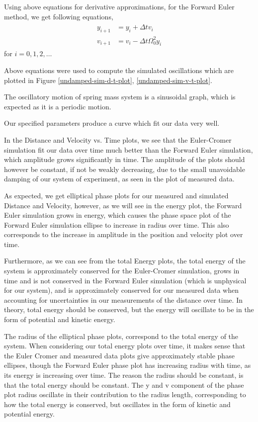 \documentclass[letterpaper,12pt]{article}
\begin{document}
Using above equations for derivative approximations, for the Forward Euler method, we get following equations,
\begin{eqnarray*}
  \begin{split}
    y_{i+1} &= y_i + \Delta t v_i \\
    v_{i+1} &= v_i -\Delta t \Omega_0^2 y_i
  \end{split}
\end{eqnarray*}
for $i = 0, 1, 2, \dots$

Above equations were used to compute the simulated oscillations which are plotted in Figure \ref{undamped-sim-d-t-plot}, \ref{undamped-sim-v-t-plot}. 

The oscillatory motion of spring mass system is a sinusoidal graph, which is expected as it is a periodic motion.

Our specified parameters produce a curve which fit our data very well.

In the Distance and Velocity vs. Time plots, we see that the Euler-Cromer simulation fit our data over time much better than the Forward Euler simulation, which amplitude grows significantly in time. The amplitude of the plots should however be constant, if not be weakly decreasing, due to the small unavoidable damping of our system of experiment, as seen in the plot of measured data.

As expected, we get elliptical phase plots for our measured and simulated Distance and Velocity, however, as we will see in the energy plot, the Forward Euler simulation grows in energy, which causes the phase space plot of the Forward Euler simulation ellipse to increase in radius over time. This also corresponds to the increase in amplitude in the position and velocity plot over time.

Furthermore, as we can see from the total Energy plots, the total energy of the system is approximately conserved for the Euler-Cromer simulation, grows in time and is not conserved in the Forward Euler simulation (which is unphysical for our system), and is approximately conserved for our measured data when accounting for uncertainties in our measurements of the distance over time. In theory, total energy should be conserved, but the energy will oscillate to be in the form of potential and kinetic energy.

The radius of the elliptical phase plots, correspond to the total energy of the system. When considering our total energy plots over time, it makes sense that the Euler Cromer and measured data plots give approximately stable phase ellipses, though the Forward Euler phase plot has increasing radius with time, as its energy is increasing over time. The reason the radius should be constant, is that the total energy should be constant. The y and v component of the phase plot radius oscillate in their contribution to the radius length, corresponding to how the total energy is conserved, but oscillates in the form of kinetic and potential energy.
\end{document}
